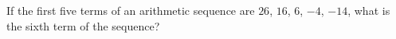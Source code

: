 If the first five terms of an arithmetic sequence are $26$, $16$, $6$, $-4$, $-14$, what is the sixth term of the sequence?

